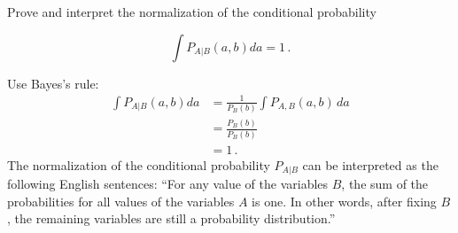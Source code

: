 

Prove and interpret the normalization of the conditional probability

\begin{equation*}
  \int P_{A|B}(a, b) da = 1 \, .
\end{equation*}


Use Bayes's rule:
\begin{align*}
  \int P_{A|B}(a, b) da
  &= \frac{1}{P_B(b)} \int P_{A,B}(a, b) \, da \\
  &= \frac{P_B(b)}{P_B(b)} \\
  &= 1 \, .
\end{align*}
The normalization of the conditional probability $P_{A|B}$ can be interpreted as the following English sentences: ``For any value of the variables $B$, the sum of the probabilities for all values of the variables $A$ is one.
In other words, after fixing $B$, the remaining variables are still a probability distribution.''
